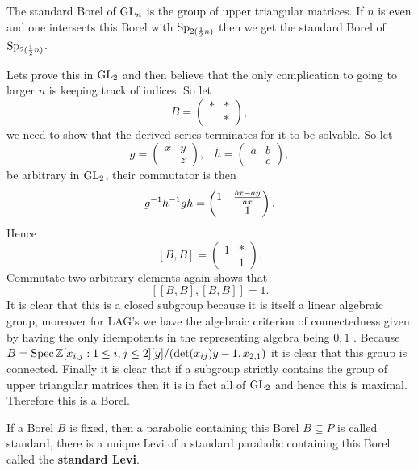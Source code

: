     \begin{example}
        The standard Borel of \(\operatorname{GL}_n\) is the group of upper triangular matrices. If \(n\) is even and one intersects this Borel with \(\operatorname{Sp}_{2(\frac{1}{2}n)}\) then we get the standard Borel of \(\operatorname{Sp}_{2(\frac{1}{2}n)}\).

        Lets prove this in \(\operatorname{GL}_2\) and then believe that the only complication to going to larger \(n\) is keeping track of indices. So let 
        \[B = \begin{pmatrix}
            \ast & \ast \\
             & \ast
        \end{pmatrix},\]
        we need to show that the derived series terminates for it to be solvable. So let 
        \[g = \begin{pmatrix}
            x & y\\
             & z
        \end{pmatrix}, \;\;\; h = \begin{pmatrix}
            a & b \\
            & c
        \end{pmatrix},\]
        be arbitrary in \(\operatorname{GL}_2\), their commutator is then 
        \[g^{-1} h^{-1} gh =  \begin{pmatrix}
            1 & \frac{bx - ay}{ax} \\ & 1
        \end{pmatrix} .\]
        Hence
        \[[B, B] = \begin{pmatrix}
            1 & \ast \\ & 1
        \end{pmatrix}.\]
        Commutate two arbitrary elements again shows that  
        \[[[B, B], [B, B]] = 1.\]
    It is clear that this is a closed subgroup because it is itself a linear algebraic group, moreover for LAG's we have the algebraic criterion of connectedness given by having the only idempotents in the representing algebra being \(0, 1\) \cite[1.5]{getzIntroductionAutomorphicRepresentations2024}. Because \(B = \Spec \Z[x_{i,j}: 1\leq i,j\leq 2][y] / (\det(x_{ij})y - 1, x_{2,1})\) it is clear that this group is connected.     
    Finally it is clear that if a subgroup strictly contains the group of upper triangular matrices then it is in fact all of \(\operatorname{GL}_2\) and hence this is maximal. Therefore this is a Borel.
    \end{example}

    If a Borel \(B\) is fixed, then a parabolic containing this Borel \(B\subseteq P\) is called standard, there is a unique Levi of a standard parabolic containing this Borel called the \textbf{standard Levi}.
    

